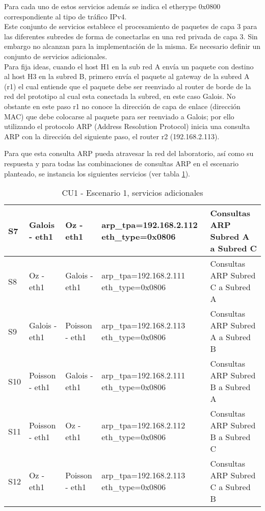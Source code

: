 Para cada uno de estos servicios adem\'as se indica el etherype 0x0800 correspondiente al tipo de tr\'afico IPv4.\\

Este conjunto de servicios establece el procesamiento de paquetes de capa 3 para las diferentes subredes de forma de conectarlas en una red privada de capa 3. Sin embargo no alcanzan para la implementaci\'on de la misma. Es necesario definir un conjunto de servicios adicionales.\\

Para fija ideas, cuando el host H1 en la sub red A envía un paquete con destino al host H3 en la subred B, primero envía el paquete al gateway de la subred A (r1) el cual entiende que el paquete debe ser reenviado al router de borde de la red del prototipo al cual esta conectada la subred, en este caso Galois. No obstante en este paso r1 no conoce la dirección de capa de enlace (direcci\'on MAC) que debe colocarse al paquete para ser reenviado a Galois; por ello utilizando el protocolo ARP (Address Resolution Protocol) inicia una consulta ARP con la direcci\'on del siguiente paso, el router r2  
 (192.168.2.113).

Para que esta consulta ARP pueda atravesar la red del laboratorio, así como su respuesta y para todas las combinaciones de consultas ARP en el escenario planteado, se instancia los siguientes servicios 
 (ver tabla \ref{table:TablaFlujos2}). 

\begin{table}[h]
\begin{tabular}{| l | l | l | p{4cm} | p{4cm} |}
\hline
 
S7 & Galois - eth1 & Oz - eth1 & arp\_tpa=192.168.2.112 eth\_type=0x0806 & Consultas ARP Subred A a Subred C \\ \hline

S8 & Oz - eth1 & Galois - eth1 & arp\_tpa=192.168.2.111 eth\_type=0x0806 & Consultas ARP Subred C a Subred A \\ \hline

S9 & Galois - eth1 & Poisson - eth1 & arp\_tpa=192.168.2.113 eth\_type=0x0806 & Consultas ARP Subred A a Subred B \\ \hline

S10 & Poisson - eth1 & Galois - eth1 & arp\_tpa=192.168.2.111 eth\_type=0x0806 & Consultas ARP Subred B a Subred A \\ \hline

S11 & Poisson - eth1 & Oz - eth1 & arp\_tpa=192.168.2.112 eth\_type=0x0806 & Consultas ARP Subred B a Subred C \\ \hline

S12 & Oz - eth1 & Poisson - eth1 & arp\_tpa=192.168.2.113 eth\_type=0x0806 & Consultas ARP Subred C a Subred B \\ \hline

\end{tabular}
\vspace{0.3cm}
\caption[CU1 - Escenario 1, servicios adicionales]{CU1 - Escenario 1, servicios adicionales}
\label{table:TablaFlujos2}
\end{table}

